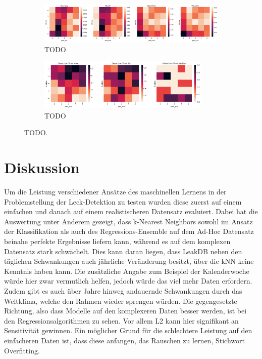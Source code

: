  \begin{figure}
    \centering
    \begin{subfigure}{\textwidth}
        \includegraphics[width=1.3\textwidth]{res/res-fe-metrics}
        \caption{TODO\vspace{1em}}
        \label{fig:res-fe-metrics}
    \end{subfigure}
    \begin{subfigure}{\textwidth}
        \includegraphics[width=0.9\textwidth]{res/res-fe-dt}
        \caption{TODO}
        \label{fig:res-fe-dt}
    \end{subfigure}
    \caption{TODO.}
\end{figure}

\section{Diskussion \label{Chapter-Discussion}}

Um die Leistung verschiedener Ansätze des maschinellen Lernens in der Problemstellung der Leck-Detektion zu
 testen wurden diese zuerst auf einem einfachen und danach auf einem realistischeren Datensatz evaluiert. Dabei
 hat die Auswertung unter Anderem gezeigt, dass k-Nearest Neighbors sowohl im Ansatz der Klassifikation als auch
 des Regressions-Ensemble auf dem Ad-Hoc Datensatz beinahe perfekte Ergebnisse liefern kann, während es auf dem
 komplexen Datensatz stark schwächelt. Dies kann daran liegen, dass LeakDB neben den täglichen Schwankungen
 auch jährliche Veränderung besitzt, über die kNN keine Kenntnis haben kann. Die zusätzliche Angabe zum Beispiel
 der Kalenderwoche würde hier zwar vermutlich helfen, jedoch würde das viel mehr Daten erfordern. Zudem gibt es
 auch über Jahre hinweg andauernde Schwankungen durch das Weltklima, welche den Rahmen wieder sprengen würden.
 Die gegengesetzte Richtung, also dass Modelle auf den komplexeren Daten besser werden, ist bei den
 Regressionsalgorithmen zu sehen. Vor allem L2 kann hier signifikant an Sensitivität gewinnen. Ein möglicher
 Grund für die schlechtere Leistung auf den einfacheren Daten ist, dass diese anfangen, das Rauschen zu lernen,
 Stichwort Overfitting.

